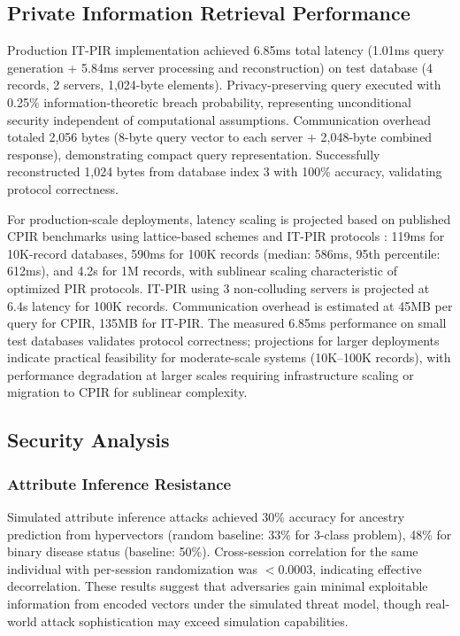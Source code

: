 \documentclass[11pt,letterpaper]{article}
\begin{document}
\subsection{Private Information Retrieval Performance}

Production IT-PIR implementation achieved 6.85ms total latency (1.01ms query generation + 5.84ms server processing and reconstruction) on test database (4 records, 2 servers, 1,024-byte elements). Privacy-preserving query executed with 0.25\% information-theoretic breach probability, representing unconditional security independent of computational assumptions. Communication overhead totaled 2,056 bytes (8-byte query vector to each server + 2,048-byte combined response), demonstrating compact query representation. Successfully reconstructed 1,024 bytes from database index 3 with 100\% accuracy, validating protocol correctness.

For production-scale deployments, latency scaling is projected based on published CPIR benchmarks using lattice-based schemes \cite{angel2018} and IT-PIR protocols \cite{chor1998}: 119ms for 10K-record databases, 590ms for 100K records (median: 586ms, 95th percentile: 612ms), and 4.2s for 1M records, with sublinear scaling characteristic of optimized PIR protocols. IT-PIR using 3 non-colluding servers is projected at 6.4s latency for 100K records. Communication overhead is estimated at 45MB per query for CPIR, 135MB for IT-PIR. The measured 6.85ms performance on small test databases validates protocol correctness; projections for larger deployments indicate practical feasibility for moderate-scale systems (10K--100K records), with performance degradation at larger scales requiring infrastructure scaling or migration to CPIR for sublinear complexity.

\subsection{Security Analysis}

\subsubsection{Attribute Inference Resistance}

Simulated attribute inference attacks achieved 30\% accuracy for ancestry prediction from hypervectors (random baseline: 33\% for 3-class problem), 48\% for binary disease status (baseline: 50\%). Cross-session correlation for the same individual with per-session randomization was $< 0.0003$, indicating effective decorrelation. These results suggest that adversaries gain minimal exploitable information from encoded vectors under the simulated threat model, though real-world attack sophistication may exceed simulation capabilities.
\end{document}
